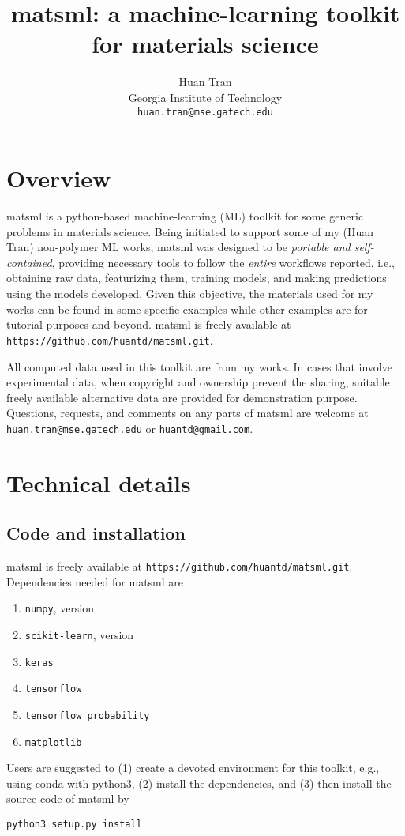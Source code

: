 \documentclass[12pt]{article}
\begin{document}
\title{\LARGE {\sc matsml}: a machine-learning toolkit for materials science}
\author{{Huan Tran}\\ 
	{Georgia Institute of Technology}\\
\texttt{huan.tran@mse.gatech.edu}}

\maketitle
\tableofcontents

\section{Overview}
{\sc matsml} is a python-based machine-learning (ML) toolkit for some generic problems in materials science. Being initiated to support some of my (Huan Tran) non-polymer ML works, {\sc matsml} was designed to be {\it portable and self-contained}, providing necessary tools to follow the {\it entire} workflows reported, i.e., obtaining raw data, featurizing them, training models, and making predictions using the models developed. Given this objective, the materials used for my works can be found in some specific examples while other examples are for tutorial purposes and beyond. {\sc matsml} is freely available at \texttt{https://github.com/huantd/matsml.git}.

All computed data used in this toolkit are from my works. In cases that involve experimental data, when copyright and ownership prevent the sharing, suitable freely available alternative data are provided for demonstration purpose. Questions, requests, and comments on any parts of {\sc matsml} are welcome at \texttt{huan.tran@mse.gatech.edu} or \texttt{huantd@gmail.com}.

\section{Technical details}
\subsection{Code and installation}
{\sc matsml} is freely available at \texttt{https://github.com/huantd/matsml.git}. Dependencies needed for {\sc matsml} are
\begin{enumerate}
  \setlength\itemsep{-0.3em}
	\item \texttt{numpy}, version 
	\item \texttt{scikit-learn}, version 
	\item \texttt{keras}
	\item \texttt{tensorflow}
	\item \texttt{tensorflow\_probability}
	\item \texttt{matplotlib}
\end{enumerate}
Users are suggested to (1) create a devoted environment for this toolkit, e.g., using conda with python3, (2) install the dependencies, and (3) then install the source code of {\sc matsml} by
\begin{tcolorbox}
\begin{verbatim}
python3 setup.py install
\end{verbatim}
\end{tcolorbox}
\end{document}
